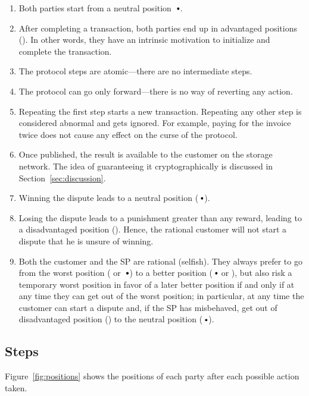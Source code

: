\begin{enumerate}
\item Both parties start from a neutral position $\neutral$.
\item After completing a transaction, both parties end up in advantaged positions (\plus{}). In other words, they have an intrinsic motivation to initialize and complete the transaction.
\item The protocol steps are atomic—there are no intermediate steps.
\item The protocol can go only forward—there is no way of reverting any action.
\item Repeating the first step starts a new transaction. Repeating any other step is considered abnormal and gets ignored. For example, paying for the invoice twice does not cause any effect on the curse of the protocol.
\item Once published, the result is available to the customer on the storage network. The idea of guaranteeing it cryptographically is discussed in Section~\ref{sec:discussion}.
\item Winning the dispute leads to a neutral position ($\neutral$).
\item Losing the dispute leads to a punishment greater than any reward, leading to a disadvantaged position (\minus{}). Hence, the rational customer will not start a dispute that he is unsure of winning.
\item Both the customer and the SP are rational (selfish). They always prefer to go from the worst position (\minus{} or $\neutral${}) to a better position ($\neutral$ or \plus), but also risk a temporary worst position in favor of a later better position if and only if at any time they can get out of the worst position; in particular, at any time the customer can start a dispute and, if the SP has misbehaved, get out of disadvantaged position (\minus) to the neutral position ($\neutral$).
\end{enumerate}

\subsection{Steps}\label{sec:steps}

Figure~\ref{fig:positions} shows the positions of each party after each possible action taken.

